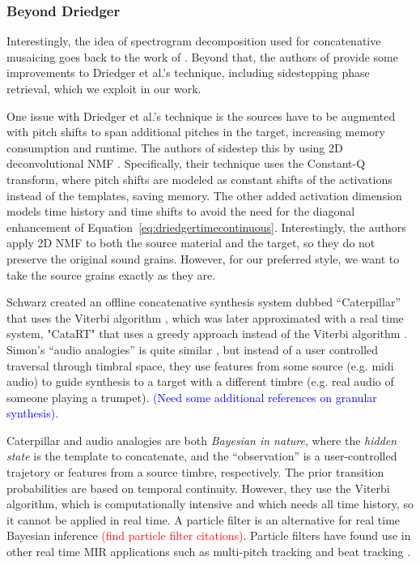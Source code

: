 \documentclass{article}
\newcommand{\ChrisEdit}[1]{\textcolor{red}{(#1)}}
\newcommand{\BenEdit}[1]{\textcolor{blue}{(#1)}}
\begin{document}
\subsubsection{Beyond Driedger}
Interestingly, the idea of spectrogram decomposition used for concatenative musaicing goes back to the work of \cite{burred2013cross}.  Beyond that, the authors of \cite{buch2017nichtnegativematrixfaktorisierungnutzendesklangsynthesensystem} provide some improvements to Driedger et al.'s technique, including sidestepping phase retrieval, which we exploit in our work.

One issue with Driedger et al.'s technique is the sources have to be augmented with pitch shifts to span additional pitches in the target, increasing memory consumption and runtime.  The authors of \cite{foroughmand2017multi, aarabi2018music} sidestep this by using 2D deconvolutional NMF \cite{schmidt2006nonnegative}.  Specifically, their technique uses the Constant-Q transform, where pitch shifts are modeled as constant shifts of the activations instead of the templates, saving memory.  The other added activation dimension models time history and time shifts to avoid the need for the diagonal enhancement of Equation~\ref{eq:driedgertimecontinuous}.  Interestingly, the authors apply 2D NMF to both the source material and the target, so they do not preserve the original sound grains.  However, for our preferred style, we want to take the source grains exactly as they are.



Schwarz created an offline concatenative synthesis system dubbed ``Caterpillar'' that uses the Viterbi algorithm \cite{schwarz2000system}, which was later approximated with a real time system, "CataRT" that uses a greedy approach instead of the Viterbi algorithm \cite{schwarz2006real, schwarz2008principles}.  Simon's ``audio analogies'' is quite similar \cite{simon2005audio}, but instead of a user controlled traversal through timbral space, they use features from some source (e.g. midi audio) to guide synthesis to a target with a different timbre (e.g. real audio of someone playing a trumpet).  \BenEdit{Need some additional references on granular synthesis}.

Caterpillar and audio analogies are both {\em Bayesian in nature}, where the {\em hidden state} is the template to concatenate, and the ``observation'' is a user-controlled trajetory or features from a source timbre, respectively.  The prior transition probabilities are based on temporal continuity.  However, they use the Viterbi algorithm, which is computationally intensive and which needs all time history, so it cannot be applied in real time.  A particle filter is an alternative for real time Bayesian inference \ChrisEdit{find particle filter citations}.  Particle filters have found use in other real time MIR applications such as multi-pitch tracking \cite{duan2011state} and beat tracking \cite{heydari2021don}.  
\end{document}
